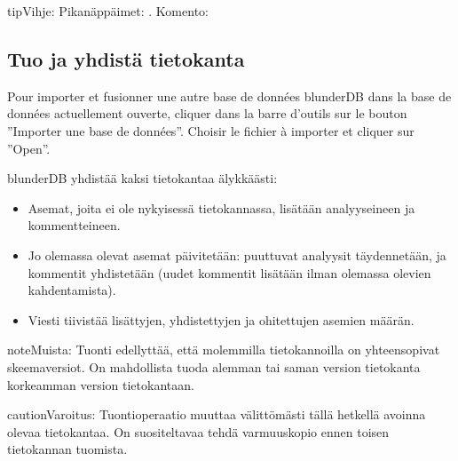\documentclass[letterpaper,10pt,finnish]{sphinxmanual}
\begin{document}
\begin{sphinxadmonition}{tip}{Vihje:}
\sphinxAtStartPar
Pikanäppäimet: . Komento: 
\end{sphinxadmonition}


\subsection{Tuo ja yhdistä tietokanta}
\label{\detokenize{guide_utilisateur:importer-et-fusionner-une-base-de-donnees}}
\sphinxAtStartPar
Pour importer et fusionner une autre base de données blunderDB dans la base de
données actuellement ouverte, cliquer dans la barre d’outils sur le bouton
”Importer une base de données”. Choisir le fichier  à importer et
cliquer sur ”Open”.

\sphinxAtStartPar
blunderDB yhdistää kaksi tietokantaa älykkäästi:
\begin{itemize}
\item {} 
\sphinxAtStartPar
Asemat, joita ei ole nykyisessä tietokannassa, lisätään analyyseineen ja kommentteineen.

\item {} 
\sphinxAtStartPar
Jo olemassa olevat asemat päivitetään: puuttuvat analyysit täydennetään, ja kommentit yhdistetään (uudet kommentit lisätään ilman olemassa olevien kahdentamista).

\item {} 
\sphinxAtStartPar
Viesti tiivistää lisättyjen, yhdistettyjen ja ohitettujen asemien määrän.

\end{itemize}

\begin{sphinxadmonition}{note}{Muista:}
\sphinxAtStartPar
Tuonti edellyttää, että molemmilla tietokannoilla on yhteensopivat skeemaversiot. On mahdollista tuoda alemman tai saman version tietokanta korkeamman version tietokantaan.
\end{sphinxadmonition}

\begin{sphinxadmonition}{caution}{Varoitus:}
\sphinxAtStartPar
Tuontioperaatio muuttaa välittömästi tällä hetkellä avoinna olevaa tietokantaa. On suositeltavaa tehdä varmuuskopio ennen toisen tietokannan tuomista.
\end{sphinxadmonition}
\end{document}
